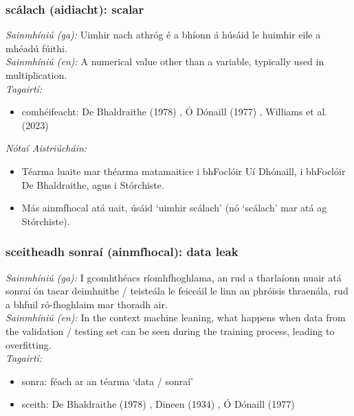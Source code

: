 \subsubsection*{scálach (aidiacht): scalar}
 \noindent \textit{Sainmhíniú (ga):} Uimhir nach athróg é a bhíonn á húsáid le huimhir eile a mhéadú fúithi.
\\
 \noindent \textit{Sainmhíniú (en):} A numerical value other than a variable, typically used in multiplication.
\\
 \noindent \textit{Tagairtí:}
\begin{itemize}
	\item comhéifeacht: De Bhaldraithe (1978) \cite{de-bhaldraithe}, Ó Dónaill (1977) \cite{odonaill}, Williams et al. (2023) \cite{storchiste}
\end{itemize}

 \noindent \textit{Nótaí Aistriúcháin:}
\begin{itemize}
	\item Téarma luaite mar théarma matamaitice i bhFoclóir Uí Dhónaill, i bhFoclóir De Bhaldraithe, agus i Stórchiste.
	\item Más ainmfhocal atá uait, úsáid `uimhir scálach' (nó `scálach' mar atá ag Stórchiste).
\end{itemize}


\subsubsection*{sceitheadh sonraí (ainmfhocal): data leak}
 \noindent \textit{Sainmhíniú (ga):} I gcomhthéacs ríomhfhoghlama, an rud a tharlaíonn nuair atá sonraí ón tacar deimhnithe / teisteála le feiceáil le linn an phróisis thraenála, rud a bhfuil ró-fhoghlaim mar thoradh air.
\\
 \noindent \textit{Sainmhíniú (en):} In the context machine leaning, what happens when data from the validation / testing set can be seen during the training process, leading to overfitting.
\\
 \noindent \textit{Tagairtí:}
\begin{itemize}
	\item sonra: féach ar an téarma `data / sonraí'
	\item sceith: De Bhaldraithe (1978) \cite{de-bhaldraithe}, Dineen (1934) \cite{dineen}, Ó Dónaill (1977) \cite{odonaill}
\end{itemize}

